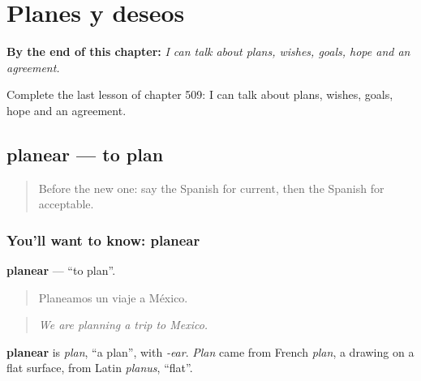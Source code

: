 
\chapter{Planes y deseos}
\label{ch:es-planes-y-deseos}

\begin{chapteropening}
\textbf{By the end of this chapter:} \emph{I can talk about plans, wishes, goals, hope and an agreement.}

Complete the last lesson of chapter 509: I can talk about plans, wishes, goals, hope and an agreement.
\end{chapteropening}

\section[planear]{planear — to plan}

\label{lesson:ES-C509-planear}



\begin{quote}
Before the new one: say the Spanish for current, then the Spanish for acceptable.
\end{quote}

\subsection*{You'll want to know: planear}
\textbf{planear} — \textquotedblleft{}to plan\textquotedblright{}.

\begin{quote}
Planeamos un viaje a México.
\end{quote}

\begin{quote}
\emph{We are planning a trip to Mexico.}
\end{quote}

\begin{cousinweb}
\textbf{planear} is \emph{plan}, \textquotedblleft{}a plan\textquotedblright{}, with \emph{-ear}. \emph{Plan} came from French \emph{plan}, a drawing on a flat surface, from Latin \emph{planus}, \textquotedblleft{}flat\textquotedblright{}.
\end{cousinweb}

